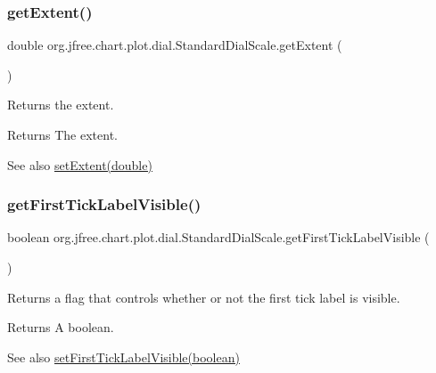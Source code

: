 \subsubsection{\texorpdfstring{get\+Extent()}{getExtent()}}
{\footnotesize\ttfamily double org.\+jfree.\+chart.\+plot.\+dial.\+Standard\+Dial\+Scale.\+get\+Extent (\begin{DoxyParamCaption}{ }\end{DoxyParamCaption})}

Returns the extent.

\begin{DoxyReturn}{Returns}
The extent.
\end{DoxyReturn}
\begin{DoxySeeAlso}{See also}
\mbox{\hyperlink{classorg_1_1jfree_1_1chart_1_1plot_1_1dial_1_1_standard_dial_scale_aae4c0d37a11986b91a2a4eff563137a8}{set\+Extent(double)}} 
\end{DoxySeeAlso}
\mbox{\label{classorg_1_1jfree_1_1chart_1_1plot_1_1dial_1_1_standard_dial_scale_a0d435c8d9de2e14b53e6999e3d8809dd}} 
\subsubsection{\texorpdfstring{get\+First\+Tick\+Label\+Visible()}{getFirstTickLabelVisible()}}
{\footnotesize\ttfamily boolean org.\+jfree.\+chart.\+plot.\+dial.\+Standard\+Dial\+Scale.\+get\+First\+Tick\+Label\+Visible (\begin{DoxyParamCaption}{ }\end{DoxyParamCaption})}

Returns a flag that controls whether or not the first tick label is visible.

\begin{DoxyReturn}{Returns}
A boolean.
\end{DoxyReturn}
\begin{DoxySeeAlso}{See also}
\mbox{\hyperlink{classorg_1_1jfree_1_1chart_1_1plot_1_1dial_1_1_standard_dial_scale_a7dbb7bf5160437cccc534abe2ec96353}{set\+First\+Tick\+Label\+Visible(boolean)}} 
\end{DoxySeeAlso}
\mbox{\label{classorg_1_1jfree_1_1chart_1_1plot_1_1dial_1_1_standard_dial_scale_a25daa271788869d663df48885997624e}} 
